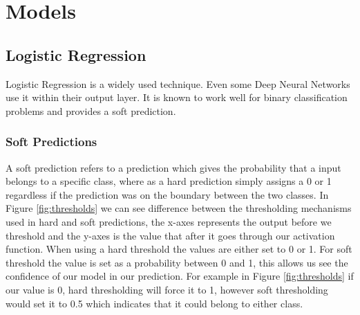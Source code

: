 \section{Models}
\subsection{Logistic Regression}
Logistic Regression is a widely used technique. Even some Deep Neural Networks use it within their output layer. It is known to work well for binary classification problems and provides a soft prediction. 
\subsubsection{Soft Predictions}
A soft prediction refers to a prediction which gives the probability that a input belongs to a specific class, where as a hard prediction simply assigns a 0 or 1 regardless if the prediction was on the boundary between the two classes. In Figure \ref{fig:thresholds} we can see difference between the thresholding mechanisms used in hard and soft predictions, the x-axes represents the output before  we threshold and the y-axes is the value that after it goes through our activation function. When using a hard threshold the values are either set to 0 or 1. For soft threshold the value is set as a probability between 0 and 1, this allows us see the confidence of our model in our prediction. For example in Figure \ref{fig:thresholds} if our value is 0, hard thresholding will force it to 1, however soft thresholding would set it to 0.5 which indicates that it could belong to either class. 

